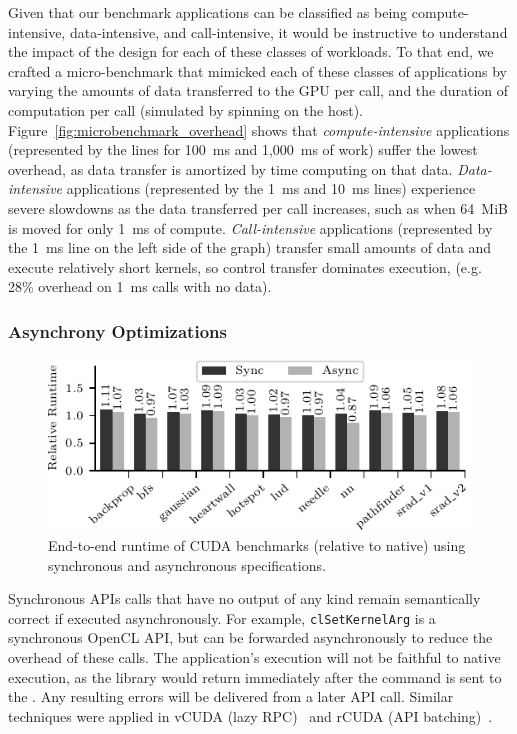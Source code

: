 Given that our benchmark applications can be classified as being
compute-intensive, data-intensive, and call-intensive, it would be instructive
to understand the impact of the \hira design for each of these classes of
workloads. To that end, we crafted a micro-benchmark that mimicked each of
these classes of applications by varying the amounts of data transferred to
the GPU per call, and the duration of computation per call (simulated by
spinning on the host). Figure~\ref{fig:microbenchmark_overhead} shows that
\emph{compute-intensive} applications (represented by the lines for 100~ms and
1,000~ms of work) suffer the lowest overhead, as data transfer is amortized by
time computing on that data. \emph{Data-intensive} applications (represented
by the 1~ms and 10~ms lines) experience severe slowdowns as the data
transferred per call increases, such as when 64~MiB is moved for only 1~ms of
compute. \emph{Call-intensive} applications (represented by the 1~ms line on
the left side of the graph) transfer small amounts of data and execute
relatively short kernels, so control transfer dominates execution, (e.g. 28\%
overhead on 1~ms calls with no data).

\subsubsection{Asynchrony Optimizations}
\label{s:opt_eval}

\begin{figure}[!th]
	\centering
	\includegraphics[width=0.7\linewidth]{ava/data/end2end/end2end_async.pdf}%
	\caption{End-to-end runtime of CUDA benchmarks (relative to native) using synchronous and asynchronous specifications.}
	\label{fig:eval_async}
\end{figure}

Synchronous APIs calls that have no output of any kind remain semantically
correct if executed asynchronously. For example, \lstinline|clSetKernelArg| is
a synchronous OpenCL API, but can be forwarded asynchronously to reduce the
overhead of these calls. The application's execution will not be faithful to
native execution, as the library would return immediately after the command is
sent to the \worker. Any resulting errors will be delivered from a later API
call. Similar techniques were applied in vCUDA (lazy RPC)~\cite{vCUDA} and
rCUDA (API batching)~\cite{rCUDA}.

